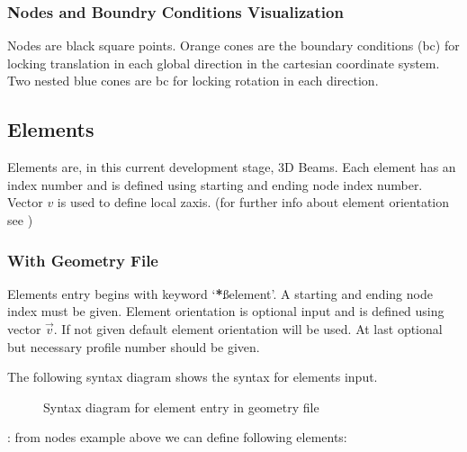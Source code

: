 \documentclass[letterpaper,10pt,english]{sphinxmanual}
\begin{document}
\noindent{}


\subsubsection{Nodes and Boundry Conditions Visualization}
\label{\detokenize{making_a_model:nodes-and-boundry-conditions-visualization}}
Nodes are black square points. Orange cones are the boundary conditions (bc) for locking translation in each global direction
in the cartesian coordinate system. Two nested blue cones are bc for locking rotation in each direction.

\noindent{}


\subsection{Elements}
\label{\detokenize{making_a_model:elements}}
Elements are, in this current development stage, 3D Beams. Each element has an index number and is defined using starting
and ending node index number. Vector \(v\) is used to define local z\sphinxhyphen{}axis. (for further info about element
orientation see {\hyperref[\detokenize{theory::doc}]{}})


\subsubsection{With Geometry File}
\label{\detokenize{making_a_model:id3}}
Elements entry begins with keyword ‘{\color{red}\bfseries{}*}ßelement’. A starting and ending node index must be given.
Element orientation is optional input and is defined using vector \(\vec{v}\).
If not given default element orientation will be used.
At last optional but necessary profile number should be given.

The following syntax diagram shows the syntax for elements input.

\begin{figure}[htbp]
\centering
\capstart

\noindent{}
\caption{Syntax diagram for element entry in geometry file}\label{\detokenize{making_a_model:id23}}\end{figure}

:
from nodes example above we can define following elements:

\begin{sphinxVerbatim}[commandchars=\\\{\}]
\end{sphinxVerbatim}
\end{document}
